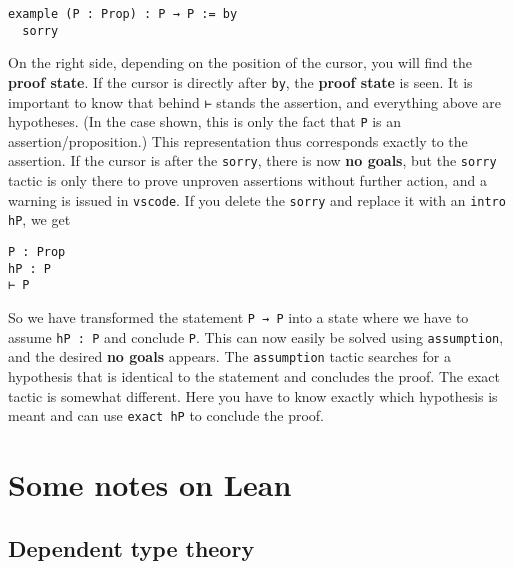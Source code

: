 \documentclass{memoir}
\begin{document}
\begin{verbatim}
example (P : Prop) : P → P := by
  sorry

\end{verbatim}


On the right side, depending on the position of the cursor, you will find the \textbf{proof state}. If the cursor is directly after \Verb|by|, the \textbf{proof state} is seen. It is important to know that behind \Verb|⊢| stands the assertion, and everything above are hypotheses. (In the case shown, this is only the fact that \Verb|P| is an assertion/proposition.) This representation thus corresponds exactly to the assertion. If the cursor is after the \Verb|sorry|, there is now \textbf{no goals}, but the \Verb|sorry| tactic is only there to prove unproven assertions without further action, and a warning is issued in \Verb|vscode|. If you delete the \Verb|sorry| and replace it with an \Verb|intro hP|, we get

\begin{verbatim}
P : Prop
hP : P
⊢ P

\end{verbatim}


So we have transformed the statement \Verb|P → P| into a state where we have to assume \Verb|hP : P| and conclude \Verb|P|. This can now easily be solved using \Verb|assumption|, and the desired \textbf{no goals} appears. The \Verb|assumption| tactic searches for a hypothesis that is identical to the statement and concludes the proof. The exact  tactic is somewhat different. Here you have to know exactly which hypothesis is meant and can use \Verb|exact hP| to conclude the proof.



\section{Some notes on Lean}



\subsection{Dependent type theory}
\end{document}
